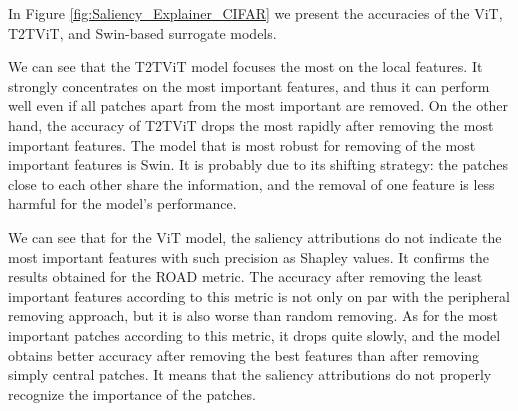 \documentclass[en]{pracamgr}
\begin{document}
In Figure \ref{fig:Saliency_Explainer_CIFAR} we present the accuracies of the ViT, T2T\textunderscore ViT, and Swin-based surrogate models.





We can see that the T2T\textunderscore ViT model focuses the most on the local features. It strongly concentrates on the most important features, and thus it can perform well even if all patches apart from the most important are removed. On the other hand, the accuracy of T2T\textunderscore ViT drops the most rapidly after removing the most important features. The model that is most robust for removing of the most important features is Swin. It is probably due to its shifting strategy: the patches close to each other share the information, and the removal of one feature is less harmful for the model's performance.

We can see that for the ViT model, the saliency attributions do not indicate the most important features with such precision as Shapley values. It confirms the results obtained for the ROAD metric. The accuracy after removing the least important features according to this metric is not only on par with the peripheral removing approach, but it is also worse than random removing. As for the most important patches according to this metric, it drops quite slowly, and the model obtains better accuracy after removing the best features than after removing simply central patches. It means that the saliency attributions do not properly recognize the importance of the patches.

\iftrue
\end{document}
